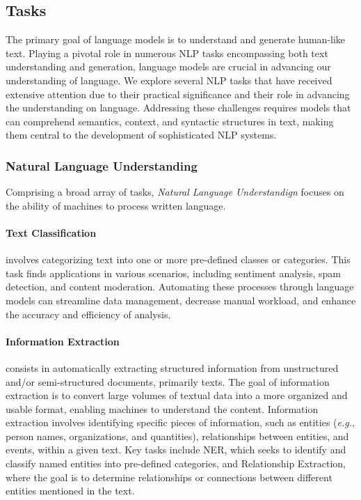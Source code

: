 \subsection{Tasks} 

The primary goal of language models is to understand and generate human-like text. Playing a pivotal role in numerous \ac{NLP} tasks encompassing both text understanding and generation, language models are crucial in advancing our understanding of language. We explore several \ac{NLP} tasks that have received extensive attention due to their practical significance and their role in advancing the understanding on language. Addressing these challenges requires models that can comprehend semantics, context, and syntactic structures in text, making them central to the development of sophisticated \ac{NLP} systems.

\subsubsection{Natural Language Understanding}

Comprising a broad array of tasks, \textit{Natural Language Understandign} focuses on the ability of machines to process written language. 

\paragraph{Text Classification} involves categorizing text into one or more pre-defined classes or categories. This task finds applications in various scenarios, including sentiment analysis, spam detection, and content moderation. Automating these processes through language models can streamline data management, decrease manual workload, and enhance the accuracy and efficiency of analysis. 

\paragraph{Information Extraction} consists in automatically extracting structured information from unstructured and/or semi-structured documents, primarily texts. The goal of information extraction is to convert large volumes of textual data into a more organized and usable format, enabling machines to  understand the content. Information extraction involves identifying specific pieces of information, such as entities (\textit{e.g.}, person names, organizations, and quantities), relationships between entities, and events, within a given text. Key tasks include \ac{NER}, which seeks to identify and classify named entities into pre-defined categories, and Relationship Extraction, where the goal is to determine relationships or connections between different entities mentioned in the text. 


